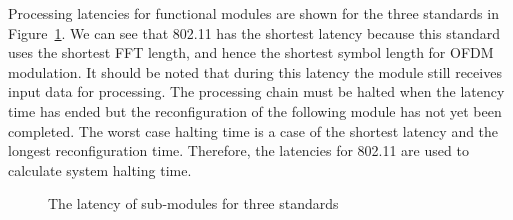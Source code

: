 Processing latencies for functional modules are shown for the three standards in Figure~\ref{fig:Latency}. We can see that 802.11 has the shortest latency because this standard uses the shortest FFT length, and hence the shortest symbol length for OFDM modulation.
It should be noted that during this latency the module still receives input data for processing.
The processing chain must be halted when the latency time has ended but the reconfiguration of the following module has not yet been completed.
The worst case halting time is a case of the shortest latency and the longest reconfiguration time.
Therefore, the latencies for 802.11 are used to calculate system halting time.
\begin{figure}
\centering
{}
\caption{The latency of sub-modules for three standards}
\label{fig:Latency}
\end{figure}

